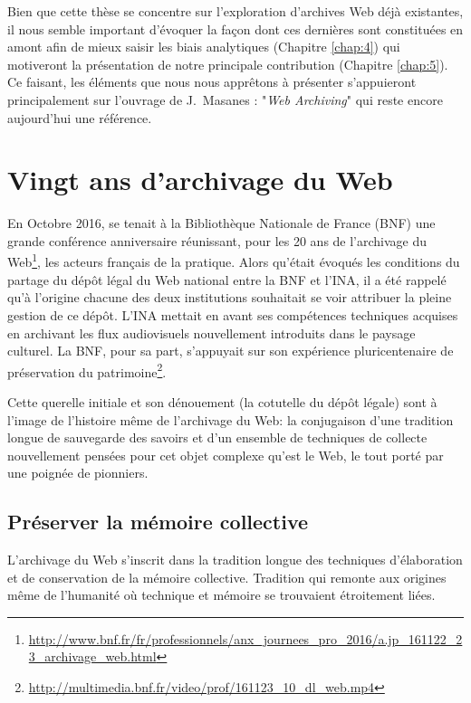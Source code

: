 \documentclass[symmetric,justified,marginals=raggedouter]{tufte-book}
\begin{document}
\noindent Bien que cette thèse se concentre sur l'exploration d'archives Web déjà existantes, il nous semble important d'évoquer la façon dont ces dernières sont constituées en amont afin de mieux saisir les biais analytiques (Chapitre \ref{chap:4}) qui motiveront la présentation de notre principale contribution (Chapitre \ref{chap:5}). Ce faisant, les éléments que nous nous apprêtons à présenter s'appuieront principalement sur l'ouvrage de J.~Masanes : "\textit{Web Archiving}" \citep{masanes_web_2006} qui reste encore aujourd'hui une référence.

\section{Vingt ans d'archivage du Web}
\label{sec:3_20ans}

\noindent En Octobre 2016, se tenait à la Bibliothèque Nationale de France (BNF) une grande conférence anniversaire réunissant, pour les 20 ans de l'archivage du Web\footnote{\url{http://www.bnf.fr/fr/professionnels/anx_journees_pro_2016/a.jp_161122_23_archivage_web.html}}, les acteurs français de la pratique. Alors qu'était évoqués les conditions du partage du dépôt légal du Web national entre la BNF et l'INA, il a été rappelé qu'à l'origine chacune des deux institutions souhaitait se voir attribuer la pleine gestion de ce dépôt. L'INA mettait en avant ses compétences techniques acquises en archivant les flux audiovisuels nouvellement introduits dans le paysage culturel. La BNF, pour sa part, s'appuyait sur son expérience pluricentenaire de préservation du patrimoine\footnote{\url{http://multimedia.bnf.fr/video/prof/161123_10_dl_web.mp4}}. 

Cette querelle initiale et son dénouement (la cotutelle du dépôt légale) sont à l'image de l'histoire même de l'archivage du Web: la conjugaison d'une tradition longue de sauvegarde des savoirs et d'un ensemble de techniques de collecte nouvellement pensées pour cet objet complexe qu'est le Web, le tout porté par une poignée de pionniers.

\subsection{Préserver la mémoire collective}

\noindent L'archivage du Web s'inscrit dans la tradition longue des techniques d'élaboration et de conservation de la mémoire collective. Tradition qui remonte aux origines même de l'humanité où technique et mémoire se trouvaient étroitement liées. 
\end{document}

